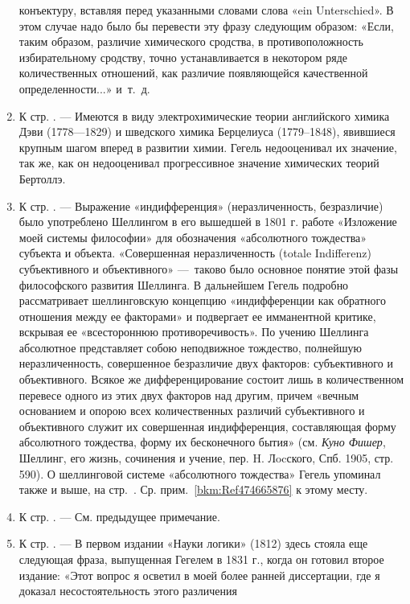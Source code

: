 \begin{enumerate}
конъектуру, вставляя перед указанными словами слова «ein Unterschied». В
этом случае надо было бы перевести эту фразу следующим образом: «Если,
таким образом, различие химического сродства, в противоположность
избирательному сродству, точно устанавливается в некотором ряде
количественных отношений, как различие появляющейся качественной
определенности...» и~т.~д.
\item \label{bkm:Ref474666725}К стр. \pageref{bkm:bm68}. — Имеются в виду
электрохимические теории английского химика Дэви (1778—1829) и шведского
химика Берцелиуса (1779–1848), явившиеся крупным шагом вперед в развитии
химии. Гегель недооценивал их значение, так же, как он недооценивал
прогрессивное значение химических теорий Бертоллэ.
\item \label{bkm:Ref474666740}К стр. \pageref{bkm:bm69}. — Выражение
«индифференция» (неразличенность, безразличие) было употреблено Шеллингом в
его вышедшей в 1801 г. работе «Изложение моей системы философии» для
обозначения «абсолютного тождества» субъекта и объекта. «Совершенная
неразличенность (totale Indifferenz) субъективного и объективного» —~таково
было основное понятие этой фазы философского развития Шеллинга. В
дальнейшем Гегель подробно рассматривает шеллинговскую концепцию
«индифференции как обратного отношения между ее факторами» и подвергает ее
имманентной критике, вскрывая ее «всестороннюю противоречивость». По учению
Шеллинга абсолютное представляет собою неподвижное тождество, полнейшую
неразличенность, совершенное безразличие двух факторов: субъективного и
объективного. Всякое же дифференцирование состоит лишь в количественном
перевесе одного из этих двух факторов над другим, причем «вечным основанием
и опорою всех количественных различий субъективного и объективного служит
их совершенная индифференция, составляющая форму абсолютного тождества,
форму их бесконечного бытия» (см. {\em Куно Фишер}, Шеллинг, его жизнь,
сочинения и учение, пер. H. Лocского, Спб. 1905, стр. 590). О шеллинговой
системе «абсолютного тождества» Гегель упоминал также и выше, на
стр.~\pageref{bkm:bm69a}. Ср. прим.~\ref{bkm:Ref474665876} к этому месту.
\item \label{bkm:Ref474666761}К стр. \pageref{bkm:bm70}. — См. предыдущее
примечание.
\item \label{bkm:Ref474666774}К стр. \pageref{bkm:bm71}. — В первом издании
«Науки логики» (1812) здесь стояла еще следующая фраза, выпущенная Гегелем
в 1831 г., когда он готовил второе издание: «Этот вопрос я осветил в моей
более ранней диссертации, где я доказал несостоятельность этого различения

\end{enumerate}
